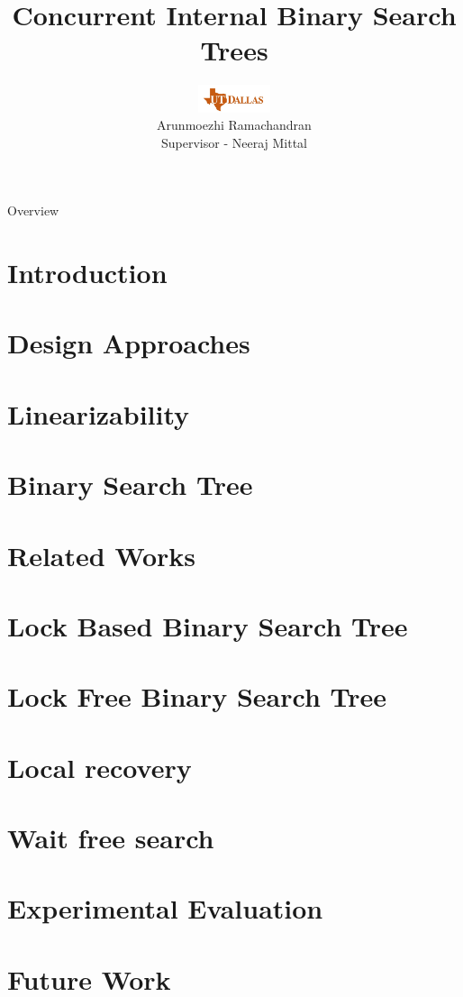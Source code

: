 \documentclass{beamer}
\title{Concurrent Internal Binary Search Trees}
\author[Arun]{\includegraphics[height=0.8cm]{figures/utd_logo.jpg}\\
Arunmoezhi Ramachandran \\
Supervisor - Neeraj Mittal\\
}
\institute[UTDallas]{The University of Texas at Dallas}
\date{}
\begin{document}
\begin{frame}
	\titlepage
\end{frame}

		
\begin{frame}{Overview}
	\tableofcontents
\end{frame}

\section{Introduction}


\section{Design Approaches}


\section{Linearizability}


\section{Binary Search Tree}


\section{Related Works}


\section{Lock Based Binary Search Tree}


\section{Lock Free Binary Search Tree}


\section{Local recovery}


\section{Wait free search}


\section{Experimental Evaluation}


\section{Future Work}

\end{document}
